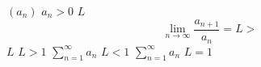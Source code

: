 \documentclass{article}
\begin{document}
$(a_n)$
$a_n > 0$
$L$
$$
  \lim_{n\to \infty} \frac{a_{n + 1}}{a_n} = L
>$$
$L$
$L > 1$
$\displaystyle\sum_{n = 1}^{\infty}{a_n}$
$L < 1$
$\displaystyle\sum_{n = 1}^{\infty}{a_n}$
$L = 1$
\end{document}
